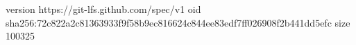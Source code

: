 version https://git-lfs.github.com/spec/v1
oid sha256:72c822a2c81363933f9f58b9ec816624c844ee83edf7ff026908f2b441dd5efc
size 100325
